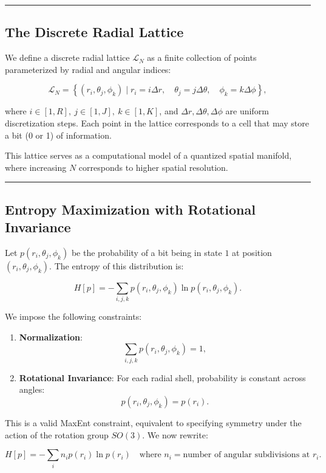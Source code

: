\documentclass[12pt, a4paper]{article}
\begin{document}
\bigskip
\hrule
\bigskip

\subsection{The Discrete Radial Lattice}

We define a discrete radial lattice $\mathcal{L}_N$ as a finite collection of points parameterized by radial and angular indices:

\[
\mathcal{L}_N = \left\{ (r_i, \theta_j, \phi_k) \mid r_i = i \Delta r, \quad \theta_j = j \Delta \theta, \quad \phi_k = k \Delta \phi \right\},
\]

where $i \in [1, R], \ j \in [1, J], \ k \in [1, K]$, and $\Delta r, \Delta \theta, \Delta \phi$ are uniform discretization steps. Each point in the lattice corresponds to a cell that may store a bit (0 or 1) of information.

This lattice serves as a computational model of a quantized spatial manifold, where increasing $N$ corresponds to higher spatial resolution.

\bigskip
\hrule
\bigskip

\subsection{Entropy Maximization with Rotational Invariance}

Let $p(r_i, \theta_j, \phi_k)$ be the probability of a bit being in state $1$ at position $(r_i, \theta_j, \phi_k)$. The entropy of this distribution is:

\[
H[p] = -\sum_{i,j,k} p(r_i, \theta_j, \phi_k) \ln p(r_i, \theta_j, \phi_k).
\]

We impose the following constraints:

\begin{enumerate}
  \item \textbf{Normalization}:
  \[
  \sum_{i,j,k} p(r_i, \theta_j, \phi_k) = 1,
  \]
  
  \item \textbf{Rotational Invariance}: For each radial shell, probability is constant across angles:
  \[
  p(r_i, \theta_j, \phi_k) = p(r_i).
  \]
\end{enumerate}

This is a valid MaxEnt constraint, equivalent to specifying symmetry under the action of the rotation group $SO(3)$. We now rewrite:

\[
H[p] = -\sum_i n_i p(r_i) \ln p(r_i) \quad \text{where } n_i = \text{number of angular subdivisions at } r_i.
\]
\end{document}
